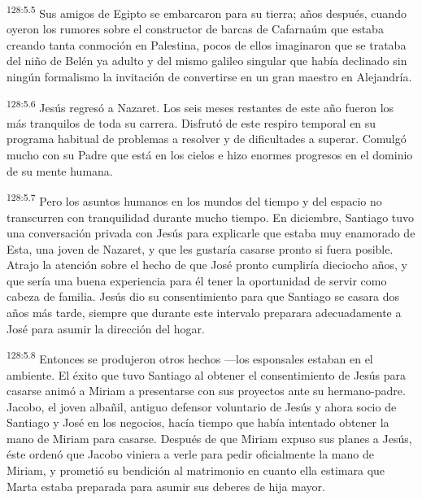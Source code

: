 \par 
\textsuperscript{128:5.5} Sus amigos de Egipto se embarcaron para su tierra; años después, cuando oyeron los rumores sobre el constructor de barcas de Cafarnaúm que estaba creando tanta conmoción en Palestina, pocos de ellos imaginaron que se trataba del niño de Belén ya adulto y del mismo galileo singular que había declinado sin ningún formalismo la invitación de convertirse en un gran maestro en Alejandría.

\par 
\textsuperscript{128:5.6} Jesús regresó a Nazaret. Los seis meses restantes de este año fueron los más tranquilos de toda su carrera. Disfrutó de este respiro temporal en su programa habitual de problemas a resolver y de dificultades a superar. Comulgó mucho con su Padre que está en los cielos e hizo enormes progresos en el dominio de su mente humana.

\par 
\textsuperscript{128:5.7} Pero los asuntos humanos en los mundos del tiempo y del espacio no transcurren con tranquilidad durante mucho tiempo. En diciembre, Santiago tuvo una conversación privada con Jesús para explicarle que estaba muy enamorado de Esta, una joven de Nazaret, y que les gustaría casarse pronto si fuera posible. Atrajo la atención sobre el hecho de que José pronto cumpliría dieciocho años, y que sería una buena experiencia para él tener la oportunidad de servir como cabeza de familia. Jesús dio su consentimiento para que Santiago se casara dos años más tarde, siempre que durante este intervalo preparara adecuadamente a José para asumir la dirección del hogar.

\par 
\textsuperscript{128:5.8} Entonces se produjeron otros hechos ---los esponsales estaban en el ambiente. El éxito que tuvo Santiago al obtener el consentimiento de Jesús para casarse animó a Miriam a presentarse con sus proyectos ante su hermano-padre. Jacobo, el joven albañil, antiguo defensor voluntario de Jesús y ahora socio de Santiago y José en los negocios, hacía tiempo que había intentado obtener la mano de Miriam para casarse. Después de que Miriam expuso sus planes a Jesús, éste ordenó que Jacobo viniera a verle para pedir oficialmente la mano de Miriam, y prometió su bendición al matrimonio en cuanto ella estimara que Marta estaba preparada para asumir sus deberes de hija mayor.

